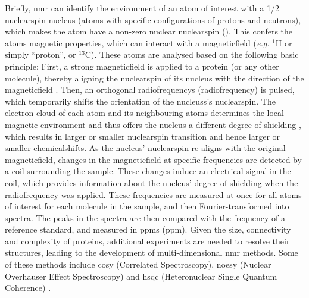 Briefly, \gls{nmr} can identify the environment of an atom of interest with a 1/2 \gls{nuclearspin} \gls{nucleus} (atoms with specific configurations of \glspl{proton} and \glspl{neutron}), which makes the atom have a non-zero nuclear \gls{nuclearspin} (). This confers the atoms magnetic properties, which can interact with a \gls{magneticfield} (\textit{e.g.} $^{1}\text{H}$ or simply ``\gls{proton}'', or $^{13}\text{C}$). These atoms are analysed based on the following basic principle: First, a strong \gls{magneticfield} is applied to a protein (or any other molecule), thereby aligning the \gls{nuclearspin} of its \gls{nucleus} with the direction of the \gls{magneticfield} \cite{marion_introduction_2013}. Then, an orthogonal \glspl{radiofrequency} (\gls{radiofrequency}) is pulsed, which temporarily shifts the orientation of the \glspl{nucleus}'s \gls{nuclearspin}. The \gls{electron} cloud of each atom and its neighbouring atoms determines the local magnetic environment and thus offers the \gls{nucleus} a different degree of shielding \cite{marion_introduction_2013}, which results in larger or smaller \gls{nuclearspin} transition and hence larger or smaller \glspl{chemicalshift}. As the \gls{nucleus}' \gls{nuclearspin} re-aligns with the original \gls{magneticfield}, changes in the \gls{magneticfield} at specific frequencies are detected by a coil surrounding the sample. These changes induce an electrical signal in the coil, which provides information about the \gls{nucleus}' degree of shielding when the \gls{radiofrequency} was applied. These frequencies are measured at once for all atoms of interest for each molecule in the sample, and then Fourier-transformed into spectra. The peaks in the spectra are then compared with the frequency of a reference standard, and measured in \glspl{ppm} (ppm). 
Given the size, connectivity and complexity of proteins, additional experiments are needed to resolve their structures, leading to the development of multi-dimensional \gls{nmr} methods. Some of these methods include \gls{cosy} (Correlated Spectroscopy), \gls{noesy} (Nuclear Overhauser Effect Spectroscopy) and \gls{hsqc} (Heteronuclear Single Quantum Coherence)  \cite{kline_determination_1988, kwan_macromolecular_2011}.


